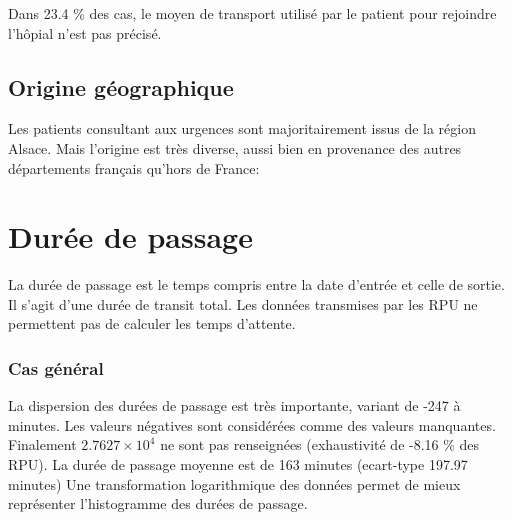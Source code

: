 \documentclass[12pt,english,french,twoside]{report}\usepackage[]{graphicx}\usepackage[]{color}
\begin{document}
Dans 23.4 \% des cas, le moyen de transport utilisé par le patient pour rejoindre l'hôpial n'est pas précisé.

\section*{Origine géographique}



Les patients consultant aux urgences sont majoritairement issus de la région Alsace. Mais l'origine est très diverse, aussi bien en provenance des autres départements français qu'hors de France:



\newpage
\chapter{Durée de passage}


La durée de passage est le temps compris entre la date d'entrée et celle de sortie. Il s'agit d'une durée de transit total. Les données transmises par les RPU ne permettent pas de calculer les temps d'attente.

\subsection{Cas général}




La dispersion des durées de passage est très importante, variant de -247 à  minutes. Les valeurs négatives sont considérées comme des valeurs manquantes. 
Finalement \ensuremath{2.7627\times 10^{4}} ne sont pas renseignées (exhaustivité de -8.16 \% des RPU). 
La durée de passage moyenne est de 163 minutes (ecart-type 197.97 minutes)
Une transformation logarithmique des données permet de mieux représenter l'histogramme des durées de passage. 
\end{document}
